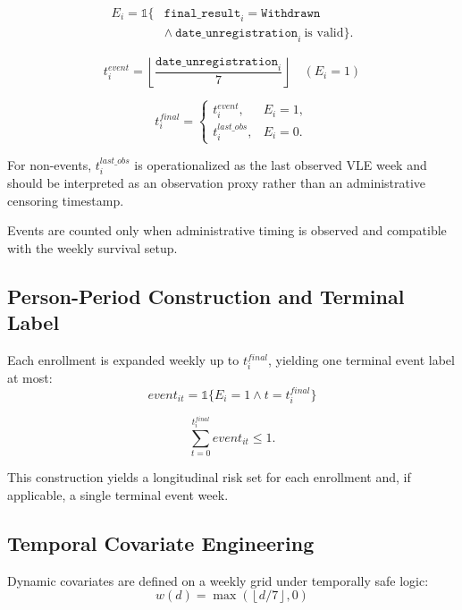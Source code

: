 \begin{equation*}
\begin{aligned}
E_i=\mathbb{1}\{&\texttt{final\_result}_i=\texttt{Withdrawn} \\
&\land\ \texttt{date\_unregistration}_i\ \text{is valid}\}.
\end{aligned}
\end{equation*}

\begin{equation*}
t_i^{event}=\left\lfloor \frac{\texttt{date\_unregistration}_i}{7} \right\rfloor \quad (E_i=1)
\end{equation*}

\begin{equation*}
t_i^{final}=\begin{cases}
t_i^{event}, & E_i=1, \\
t_i^{last\_obs}, & E_i=0.
\end{cases}
\end{equation*}

For non-events, $t_i^{last\_obs}$ is operationalized as the last observed VLE week and should be interpreted as an observation proxy rather than an administrative censoring timestamp.

Events are counted only when administrative timing is observed and compatible with the weekly survival setup.

\subsection{Person-Period Construction and Terminal Label}

Each enrollment is expanded weekly up to $t_i^{final}$, yielding one terminal event label at most:
\begin{equation*}
event_{it}=\mathbb{1}\{E_i=1 \land t=t_i^{final}\}
\end{equation*}

\begin{equation*}
\sum_{t=0}^{t_i^{final}} event_{it} \le 1.
\end{equation*}

This construction yields a longitudinal risk set for each enrollment and, if applicable, a single terminal event week.

\subsection{Temporal Covariate Engineering}

Dynamic covariates are defined on a weekly grid under temporally safe logic:
\begin{equation*}
w(d)=\max\left(\left\lfloor d/7 \right\rfloor,0\right)
\end{equation*}

